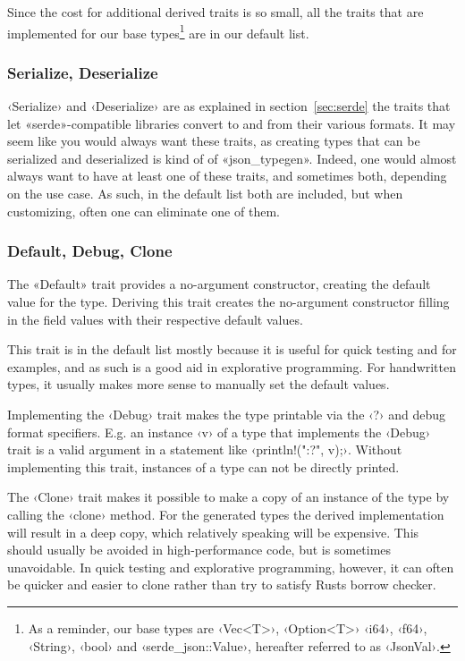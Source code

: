 Since the cost for additional derived traits is so small, all the traits that are implemented for our base types\footnote{As a reminder, our base types are ‹Vec<T>›, ‹Option<T>› ‹i64›, ‹f64›, ‹String›, ‹bool› and ‹serde_json::Value›, hereafter referred to as ‹JsonVal›.} are in our default list.

\subsubsection{Serialize, Deserialize}

‹Serialize› and ‹Deserialize› are as explained in section~\ref{sec:serde} the traits that let «serde»-compatible libraries convert to and from their various formats. It may seem like you would always want these traits, as creating types that can be serialized and deserialized is kind of  of «json_typegen». Indeed, one would almost always want to have at least one of these traits, and sometimes both, depending on the use case. As such, in the default list both are included, but when customizing, often one can eliminate one of them. %


\subsubsection{Default, Debug, Clone}

The «Default» trait provides a no-argument constructor, creating the default value for the type. Deriving this trait creates the no-argument constructor filling in the field values with their respective default values.

This trait is in the default list mostly because it is useful for quick testing and for examples, and as such is a good aid in explorative programming. For handwritten types, it usually makes more sense to manually set the default values.

Implementing the ‹Debug› trait makes the type printable via the ‹?› and  debug format specifiers. E.g. an instance ‹v› of a type that implements the ‹Debug› trait is a valid argument in a statement like ‹println!("{:?}", v);›. Without implementing this trait, instances of a type can not be directly printed.

The ‹Clone› trait makes it possible to make a copy of an instance of the type by calling the ‹clone› method. For the generated types the derived implementation will result in a deep copy, which relatively speaking will be expensive. This should usually be avoided in high-performance code, but is sometimes unavoidable. In quick testing and explorative programming, however, it can often be quicker and easier to clone rather than try to satisfy Rusts borrow checker.

